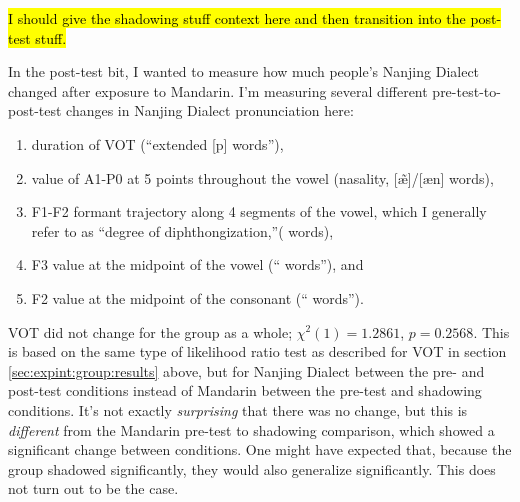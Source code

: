 \hl{I should give the shadowing stuff context here and then transition into the post-test stuff.}

In the post-test bit, I wanted to measure how much people's Nanjing Dialect changed after exposure to Mandarin. I'm measuring several different pre-test-to-post-test changes in Nanjing Dialect pronunciation here:
\begin{enumerate}
    \item duration of VOT (``extended [p] words''),
    \item value of A1-P0 at 5 points throughout the vowel (nasality, [\~{\ae}]/[{\ae n}] words),
    \item F1-F2 formant trajectory along 4 segments of the vowel, which I generally refer to as ``degree of diphthongization,''( \textipa{[e]/[iE]} words),
    \item F3 value at the midpoint of the vowel (``\textipa{[I]/[y]} words''), and
    \item F2 value at the midpoint of the consonant (``\textipa{[l]/[n]} words'').
\end{enumerate}

VOT did not change for the group as a whole; $\chi^2(1) = 1.2861$, $p = 0.2568$. This is based on the same type of likelihood ratio test as described for VOT in section \ref{sec:expint:group:results} above, but for Nanjing Dialect between the pre- and post-test conditions instead of Mandarin between the pre-test and shadowing conditions. It's not exactly \textit{surprising} that there was no change, but this is \textit{different} from the Mandarin pre-test to shadowing comparison, which showed a significant change between conditions. One might have expected that, because the group shadowed significantly, they would also generalize significantly. This does not turn out to be the case.

